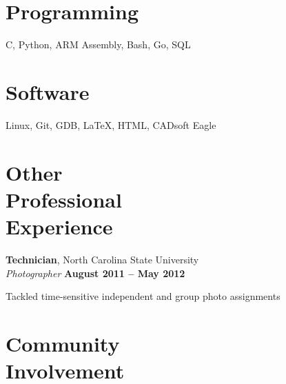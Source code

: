 \documentclass[margin,line,letterpaper]{resume}
\begin{document}
\begin{resume}
    \section{\mysidestyle Programming} 
    C, Python, ARM Assembly, Bash, Go, SQL
    \vspace{-5mm}

    \section{\mysidestyle Software} 
    Linux, Git, GDB, \LaTeX, HTML, CADsoft Eagle



    \section{\mysidestyle Other\\Professional\\Experience}

    \textbf{Technician}, North Carolina State University \vspace{2mm}\\\vspace{1mm}%
    \textsl{Photographer} \hfill \textbf{August 2011 -- May 2012}\vspace{-3mm}\\\vspace{-1mm}%
    \begin{list2}
    \item Tackled time-sensitive independent and group photo assignments
    \end{list2}\vspace{-1.5mm}

    \section{\mysidestyle Community\\Involvement}



\end{resume}
\end{document}
